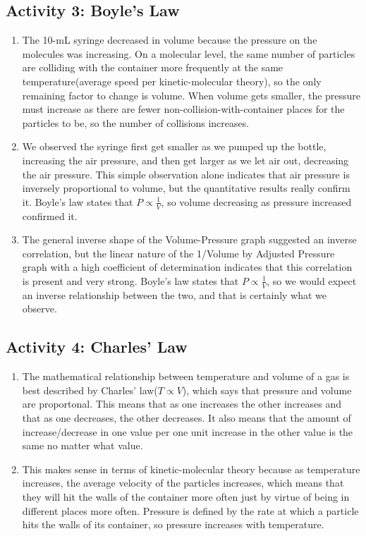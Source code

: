 \documentclass{article}
\begin{document}
\subsection{Activity 3: Boyle's Law}
    \begin{enumerate}
        \item The 10-mL syringe decreased in volume because the pressure on the molecules was increasing. On a molecular level, the same number of particles are colliding with the container more frequently at the same temperature(average speed per kinetic-molecular theory), so the only remaining factor to change is volume.  When volume gets smaller, the pressure must increase as there are fewer non-collision-with-container places for the particles to be, so the number of collisions increases.
        \item We observed the syringe first get smaller as we pumped up the bottle, increasing the air pressure, and then get larger as we let air out, decreasing the air pressure.  This simple observation alone indicates that air pressure is inversely proportional to volume, but the quantitative results really confirm it. Boyle's law states that $P \propto \frac{1}{V}$, so volume decreasing as pressure increased confirmed it.
        \item The general inverse shape of the Volume-Pressure graph suggested an inverse correlation, but the linear nature of the 1/Volume by Adjusted Pressure graph with a high coefficient of determination indicates that this correlation is present and very strong.  Boyle's law states that $P \propto \frac{1}{V}$, so we would expect an inverse relationship between the two, and that is certainly what we observe.
    \end{enumerate}
\subsection{Activity 4: Charles' Law}
\begin{enumerate}
        \item The mathematical relationship between temperature and volume of a gas is best described by Charles' law($T\propto V$), which says that pressure and volume are proportonal.  This means that as one increases the other increases and that as one decreases, the other decreases.  It also means that the amount of increase/decrease in one value per one unit increase in the other value is the same no matter what value.  
        \item This makes sense in terms of kinetic-molecular theory because as temperature increases, the average velocity of the particles increases, which means that they will hit the walls of the container more often just by virtue of being in different places more often.  Pressure is defined by the rate at which a particle hits the walls of its container, so pressure increases with temperature.
    \end{enumerate}
\end{document}

